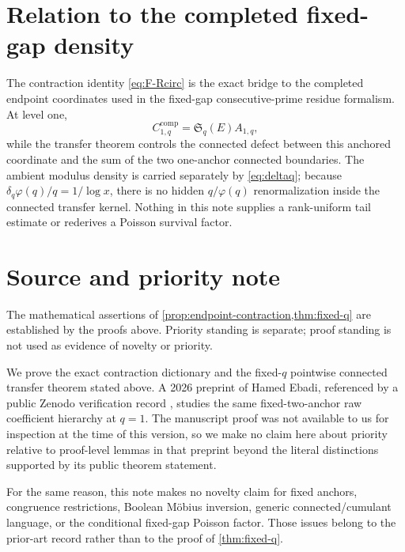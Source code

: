 \documentclass[11pt]{article}
\theoremstyle{definition}
\theoremstyle{remark}
\newcommand{\SSer}{\mathfrak S}
\newcommand{\1}{\mathbf 1}
\newcommand{\ph}{\varphi}
\begin{document}
\section{Relation to the completed fixed-gap density}\label{sec:los}

The contraction identity \eqref{eq:F-Rcirc} is the exact bridge to the completed endpoint coordinates used in the fixed-gap consecutive-prime residue formalism.  At level one,
\[
C_{1,q}^{\mathrm{comp}}=\SSer_q(E)A_{1,q},
\]
while the transfer theorem controls the connected defect between this anchored coordinate and the sum of the two one-anchor connected boundaries.  The ambient modulus density is carried separately by \eqref{eq:deltaq}; because $\delta_q\ph(q)/q=1/\log x$, there is no hidden $q/\ph(q)$ renormalization inside the connected transfer kernel.  Nothing in this note supplies a rank-uniform tail estimate or rederives a Poisson survival factor.

\section{Source and priority note}\label{sec:priority}

The mathematical assertions of \cref{prop:endpoint-contraction,thm:fixed-q} are established by the proofs above.  Priority standing is separate; proof standing is not used as evidence of novelty or priority.

We prove the exact contraction dictionary and the fixed-$q$ pointwise connected transfer theorem stated above. A 2026 preprint of Hamed Ebadi, referenced by a public Zenodo verification record \cite{Ebadi2026}, studies the same fixed-two-anchor raw coefficient hierarchy at $q=1$. The manuscript proof was not available to us for inspection at the time of this version, so we make no claim here about priority relative to proof-level lemmas in that preprint beyond the literal distinctions supported by its public theorem statement.

For the same reason, this note makes no novelty claim for fixed anchors, congruence restrictions, Boolean M\"obius inversion, generic connected/cumulant language, or the conditional fixed-gap Poisson factor.  Those issues belong to the prior-art record rather than to the proof of \cref{thm:fixed-q}.
\end{document}
